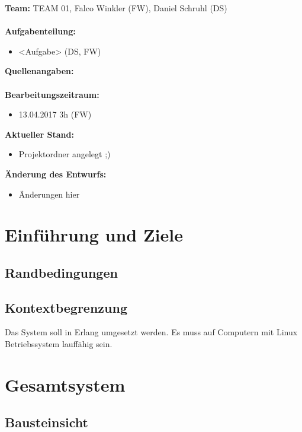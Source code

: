 \documentclass{article}
\begin{document}
\textbf{Team:} TEAM 01, Falco Winkler (FW), Daniel Schruhl (DS)\\
\\
\textbf{Aufgabenteilung:}
\begin{itemize}
    \item <Aufgabe> (DS, FW)
\end{itemize}

\textbf{Quellenangaben:}\\
\\
\textbf{Bearbeitungszeitraum:}
\begin{itemize}
	\item 13.04.2017 3h (FW)
\end{itemize}

\textbf{Aktueller Stand:}
\begin{itemize}
	\item Projektordner angelegt ;)
\end{itemize}

\textbf{Änderung des Entwurfs:}
\begin{itemize}
    \item Änderungen hier
\end{itemize}

\newpage

\section{Einführung und Ziele}

\subsection{Randbedingungen}

\subsection{Kontextbegrenzung}
Das System soll in Erlang umgesetzt werden. Es muss auf Computern mit Linux Betriebssystem lauffähig sein.

\newpage

\section{Gesamtsystem}

\subsection{Bausteinsicht}
\end{document}

